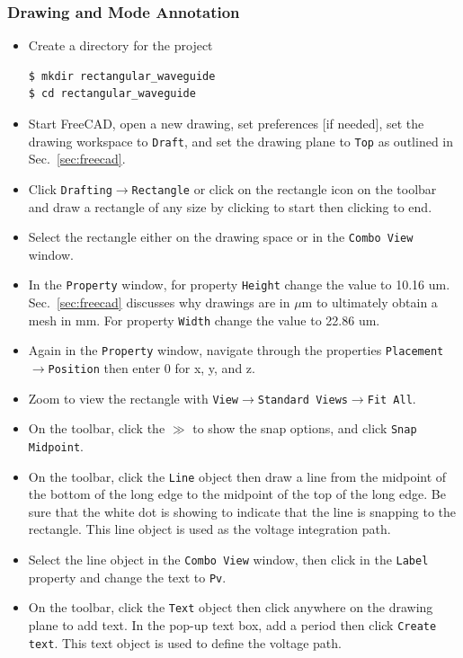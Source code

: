 \documentclass[titlepage]{article}
\renewcommand\_{\textunderscore\linebreak[1]}
\begin{document}
\subsubsection{Drawing and Mode Annotation}

\begin{itemize}
\item Create a directory for the project
\begin{Verbatim}[fontsize=\small]
$ mkdir rectangular_waveguide
$ cd rectangular_waveguide
\end{Verbatim}
\item Start FreeCAD, open a new drawing, set preferences [if needed], set the drawing workspace to \texttt{Draft}, and set the drawing plane to \texttt{Top} as outlined in Sec.~\ref{sec:freecad}.
\item Click \texttt{Drafting}$\rightarrow$\texttt{Rectangle} or click on the rectangle icon on the toolbar and draw a rectangle of any size by clicking to start then clicking to end.
\item Select the rectangle either on the drawing space or in the \texttt{Combo View} window.
\item In the \texttt{Property} window, for property \texttt{Height} change the value to 10.16 um.  Sec.~\ref{sec:freecad} discusses why drawings are in $\mu$m to ultimately obtain a mesh in mm.  For property \texttt{Width} change the value to 22.86 um.
\item Again in the \texttt{Property} window, navigate through the properties \texttt{Placement}$\rightarrow$\texttt{Position} then enter 0 for x, y, and z.
\item Zoom to view the rectangle with \texttt{View}$\rightarrow$\texttt{Standard Views}$\rightarrow$\texttt{Fit All}.
\item On the toolbar, click the $\gg$ to show the snap options, and click \texttt{Snap Midpoint}.
\item On the toolbar, click the \texttt{Line} object then draw a line from the midpoint of the bottom of the long edge to the midpoint of the top of the long edge.  Be sure that the white dot is showing to indicate that the line is snapping to the rectangle.  This line object is used as the voltage integration path.
\item Select the line object in the \texttt{Combo View} window, then click in the \texttt{Label} property and change the text to \texttt{\_Pv}.
\item On the toolbar, click the \texttt{Text} object then click anywhere on the drawing plane to add text.  In the pop-up text box, add a period then click \texttt{Create text}.  This text object is used to define the voltage path.

\end{itemize}
\end{document}
